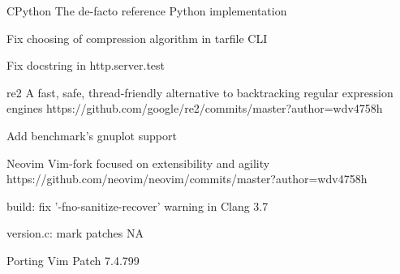 \begin{cvopensources}
  \cvopensource
    {CPython}
    {The de-facto reference Python implementation}
    {}
    {
      \begin{cvitems}
        \item {Fix choosing of compression algorithm in tarfile CLI}
        \item {Fix docstring in http.server.test}
      \end{cvitems}
    }

  \cvopensource
    {re2}
    {A fast, safe, thread-friendly alternative to backtracking regular expression engines}
    {https://github.com/google/re2/commits/master?author=wdv4758h}
    {
      \begin{cvitems}
        \item {Add benchmark's gnuplot support}
      \end{cvitems}
    }

  \cvopensource
    {Neovim}
    {Vim-fork focused on extensibility and agility}
    {https://github.com/neovim/neovim/commits/master?author=wdv4758h}
    {
      \begin{cvitems}
        \item {build: fix '-fno-sanitize-recover' warning in Clang 3.7 }
        \item {version.c: mark patches NA}
        \item {Porting Vim Patch 7.4.799}
      \end{cvitems}
    }

\end{cvopensources}
